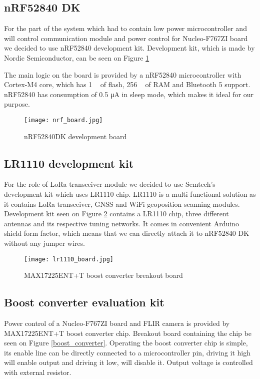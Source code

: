\subsection{ nRF52840 DK}

For the part of the system which had to contain low power microcontroller and will control communication module and power control for Nucleo-F767ZI board we decided to use nRF52840 development kit.
Development kit, which is made by Nordic Semiconductor, can be seen on Figure \ref{nrf_board}

The main logic on the board is provided by a nRF52840 microcontroller with Cortex-M4 core, which has 1 \si{\mega\byte} of flash, 256 \si{\kilo\byte} of RAM and Bluetooth 5 support.
nRF52840 has consumption of 0.5 \si{\micro\ampere} in sleep mode, which makes it ideal for our purpose.

\begin{figure}[ht]
        \centering
        \texttt{[image: nrf\_board.jpg]} 
        \caption{ nRF52840DK development board}
        \label{nrf_board}
\end{figure}

\subsection{ LR1110 development kit}

For the role of LoRa transceiver module we decided to use Semtech's development kit which uses LR1110 chip.
LR1110 is a multi functional solution as it contains LoRa transceiver, GNSS and WiFi geoposition scanning modules.
Development kit seen on Figure \ref{lr1110_board} contains a LR1110 chip, three different antennas and its respective tuning networks.
It comes in convenient Arduino shield form factor, which means that we can directly attach it to nRF52840 DK without any jumper wires.

\begin{figure}[ht]
        \centering
        \texttt{[image: lr1110\_board.jpg]} 
        \caption{ MAX17225ENT+T boost converter breakout board}
        \label{lr1110_board}
\end{figure}

\subsection{ Boost converter evaluation kit}

Power control of a Nucleo-F767ZI board and FLIR camera is provided by MAX17225ENT+T boost converter chip.
Breakout board containing the chip be seen on Figure \ref{boost_converter}.
Operating the boost converter chip is simple, its enable line can be directly connected to a microcontroller pin, driving it high will enable output and driving it low, will disable it.
Output voltage is controlled with external resistor.

